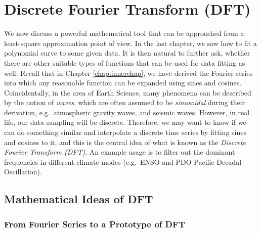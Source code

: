 \chapter{Discrete Fourier Transform (DFT)}
\label{chap:DFT}
We now discuss a powerful mathematical tool that can be approached from a least-square approximation point of view. In the last chapter, we saw how to fit a polynomial curve to some given data. It is then natural to further ask, whether there are other suitable types of functions that can be used for data fitting as well. Recall that in Chapter \ref{chap:innerchap}, we have derived the Fourier series into which any reasonable function can be expanded using sines and cosines. Coincidentally, in the area of Earth Science, many phenomena can be described by the notion of \textit{waves}, which are often assumed to be \textit{sinusoidal} during their derivation, e.g.\ atmospheric gravity waves, and seismic waves. However, in real life, our data sampling will be discrete. Therefore, we may want to know if we can do something similar and interpolate a discrete time series by fitting sines and cosines to it, and this is the central idea of what is known as the \textit{Discrete Fourier Transform (DFT)}. An example usage is to filter out the dominant frequencies in different climate modes (e.g.\ ENSO and PDO-Pacific Decadal Oscillation).

\section{Mathematical Ideas of DFT}
\label{section:DFT}

\subsection{From Fourier Series to a Prototype of DFT}
\label{section:FouriertoDFT}

